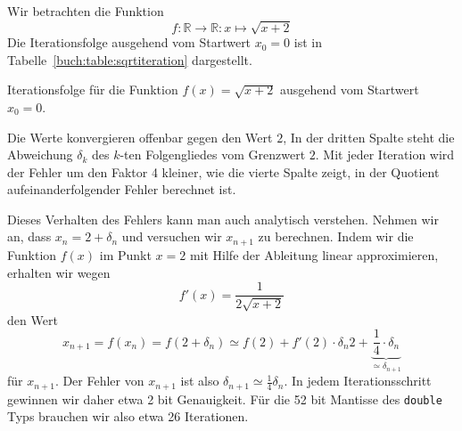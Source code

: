 \begin{beispiel}
\label{section:beispiel:sqrtiteration}
Wir betrachten die Funktion 
\[
f\colon \mathbb{R}\to\mathbb{R} : x\mapsto \sqrt{x+2}
\]
Die Iterationsfolge ausgehend vom Startwert $x_0=0$ ist in
Tabelle~\ref{buch:table:sqrtiteration} dargestellt.

\begin{table}
\centering
\renewcommand\arraystretch{1.15}

\caption{Iterationsfolge für die Funktion $f(x)=\sqrt{x+2}$ ausgehend
vom Startwert $x_0=0$.
\label{buch:table:sqrtiteration}}
\end{table}

Die Werte konvergieren offenbar gegen den Wert $2$, 
In der dritten Spalte steht die Abweichung $\delta_k$ des $k$-ten Folgengliedes
vom Grenzwert $2$.
Mit jeder Iteration wird der Fehler um den Faktor 4 kleiner, wie die
vierte Spalte zeigt, in der Quotient aufeinanderfolgender Fehler
berechnet ist.

Dieses Verhalten des Fehlers kann man auch analytisch verstehen.
Nehmen wir an, dass $x_n = 2 + \delta_n$ und versuchen wir 
$x_{n+1}$ zu berechnen.
Indem wir die Funktion $f(x)$ im Punkt $x=2$ mit Hilfe der Ableitung
linear approximieren, erhalten wir wegen
\[
f'(x) = \frac{1}{2\sqrt{x+2}}
\]
den Wert
\[
x_{n+1} = f(x_n) = f(2 + \delta_n)
\simeq
f(2) + f'(2)\cdot \delta_n
2 + \underbrace{\frac14\cdot \delta_n}_{\displaystyle\simeq\delta_{n+1}}
\]
für $x_{n+1}$.
Der Fehler von $x_{n+1}$ ist also $\delta_{n+1}\simeq\frac14\delta_n$.
In jedem Iterationsschritt gewinnen wir daher etwa 2 bit Genauigkeit.
Für die 52 bit Mantisse des \texttt{double} Typs brauchen wir also
etwa 26 Iterationen.
\end{beispiel}

